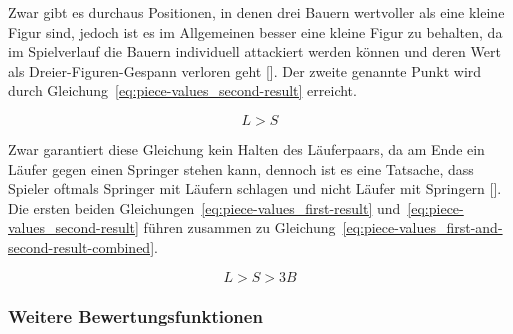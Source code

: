 \noindent Zwar gibt es durchaus Positionen, in denen drei Bauern wertvoller als eine kleine Figur sind, jedoch ist es im Allgemeinen besser eine kleine Figur zu behalten, da im Spielverlauf die Bauern individuell attackiert werden können und deren Wert als Dreier-Figuren-Gespann verloren geht [\cite{Wiki2018}].
Der zweite genannte Punkt wird durch Gleichung~\ref{eq:piece-values_second-result} erreicht.

\begin{equation} \label{eq:piece-values_second-result}
    L > S
\end{equation}

\noindent Zwar garantiert diese Gleichung kein Halten des Läuferpaars, da am Ende ein Läufer gegen einen Springer stehen kann, dennoch ist es eine Tatsache, dass Spieler oftmals Springer mit Läufern schlagen und nicht Läufer mit Springern [\cite{Wiki2018}].
Die ersten beiden Gleichungen~\ref{eq:piece-values_first-result} und~\ref{eq:piece-values_second-result} führen zusammen zu Gleichung~\ref{eq:piece-values_first-and-second-result-combined}.

\begin{equation} \label{eq:piece-values_first-and-second-result-combined}
    L > S > 3B
\end{equation}


\subsubsection{Weitere Bewertungsfunktionen}

